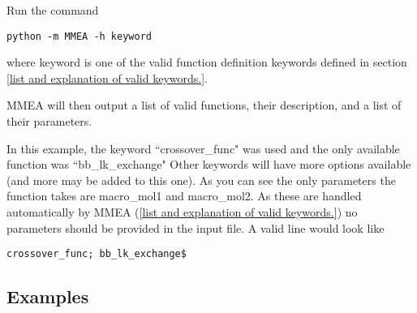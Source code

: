 \documentclass[12pt]{article}
\begin{document}
Run the command 
\begin{verbatim}
python -m MMEA -h keyword
\end{verbatim}
where keyword is one of the valid function definition keywords defined in section \ref{list and explanation of valid keywords.}.

MMEA will then output a list of valid functions, their description, and a list of their parameters.


In this example, the keyword ``crossover\_func" was used and the only available function was ``bb\_lk\_exchange" Other keywords will have more options available (and more may be added to this one). As you can see the only parameters the function takes are macro\_mol1 and macro\_mol2. As these are handled automatically by MMEA (\ref{list and explanation of valid keywords.}) no parameters should be provided in the input file. A valid line would look like
\begin{verbatim}
crossover_func; bb_lk_exchange$
\end{verbatim}



\subsection{Examples}
\label{examples}
\end{document}
